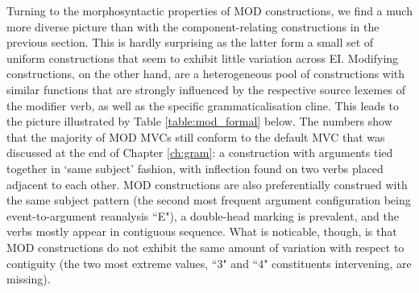 
Turning to the morphosyntactic properties of MOD constructions, we find a much more diverse picture than with the component-relating constructions in the previous section. This is hardly surprising as the latter form a small set of uniform constructions that seem to exhibit little variation across EI. Modifying constructions, on the other hand, are a heterogeneous pool of constructions with similar functions that are strongly influenced by the respective source lexemes of the modifier verb, as well as the specific grammaticalisation cline. This leads to the picture illustrated by Table \ref{table:mod_formal} below. The numbers show that the majority of MOD MVCs still conform to the default \textsc{MVC} that was discussed at the end of Chapter \ref{ch:gram}: a construction with arguments tied together in `same subject' fashion, with inflection found on two verbs placed adjacent to each other. MOD constructions are also preferentially construed with the same subject pattern (the second most frequent argument configuration being event-to-argument reanalysis ``E"), a double-head marking is prevalent, and the verbs mostly appear in contiguous sequence. What is noticable, though, is that MOD constructions do not exhibit the same amount of variation with respect to contiguity (the two most extreme values, ``3" and ``4" constituents intervening, are missing).


